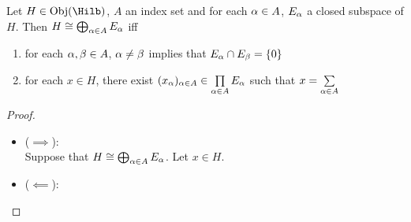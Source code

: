 \documentclass{book}
\begin{document}
\begin{ex}
	Let $H \in \Obj(\Hilb)$, $A$ an index set and for each $\alpha \in A$, $E_{\alpha}$ a closed subspace of $H$. Then $H \cong \bigoplus_{\alpha \in A} E_{\alpha}$ iff 
	\begin{enumerate}
		\item for each $\alpha, \beta \in A$, $\alpha \neq \beta$ implies that $E_{\alpha} \cap E_{\beta} = \{0\}$
		\item for each $x \in H$, there exist $(x_{\alpha})_{\alpha \in A} \in \prod\limits_{\alpha \in A} E_{\alpha}$ such that $x = \sum\limits_{\alpha \in A}$
	\end{enumerate}
\end{ex}

\begin{proof}\
	\begin{itemize}
		\item ($\implies$): \\
		Suppose that $H \cong \bigoplus_{\alpha \in A} E_{\alpha}$. Let $x \in H$. 
		\item ($\impliedby$): \\
	\end{itemize}
\end{proof}
\end{document}
